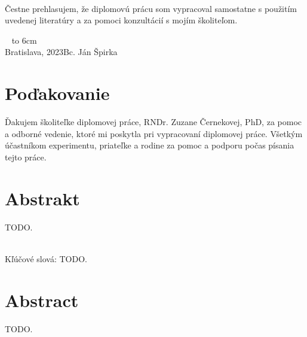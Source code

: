 \documentclass[12pt, a4paper, oneside]{book}
\newcommand\mfauthor{Bc. Ján Špirka}
\newcommand\mfplacedate{Bratislava, 2023}
\begin{document}
\noindent
\begin{minipage}{0.25\textwidth}~\end{minipage}
\begin{minipage}{0.75\textwidth}
Čestne prehlasujem, že diplomovú prácu som vypracoval samostatne s použitím uvedenej literatúry a za pomoci konzultácií s mojím školiteľom.
\newline \newline
\end{minipage}
\vfill
~ \hfill {\hbox to 6cm{\dotfill}} \\
\mfplacedate \hfill \mfauthor
\vfill\eject 



\chapter*{Poďakovanie}\label{chap:thank_you}
Ďakujem školiteľke diplomovej práce, RNDr. Zuzane Černekovej, PhD, za pomoc a odborné vedenie, ktoré mi poskytla pri vypracovaní diplomovej práce. Všetkým účastníkom experimentu, priateľke a rodine za pomoc a podporu počas písania tejto práce.
\vfill\eject 





\chapter*{Abstrakt}\label{chap:abstract_sk}
TODO.

~\\
Kľúčové slová: TODO.
\vfill\eject 



\chapter*{Abstract}\label{chap:abstract_en}
TODO.
\end{document}
